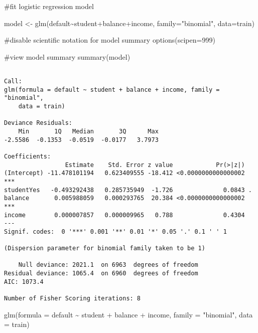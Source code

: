 \documentclass[
  letterpaper,
  DIV=11,
  numbers=noendperiod]{scrreprt}
\newenvironment{Shaded}{\begin{snugshade}}{\end{snugshade}}
\newcommand{\AttributeTok}[1]{\textcolor[rgb]{0.40,0.45,0.13}{#1}}
\newcommand{\CommentTok}[1]{\textcolor[rgb]{0.37,0.37,0.37}{#1}}
\newcommand{\DecValTok}[1]{\textcolor[rgb]{0.68,0.00,0.00}{#1}}
\newcommand{\FunctionTok}[1]{\textcolor[rgb]{0.28,0.35,0.67}{#1}}
\newcommand{\NormalTok}[1]{\textcolor[rgb]{0.00,0.23,0.31}{#1}}
\newcommand{\OtherTok}[1]{\textcolor[rgb]{0.00,0.23,0.31}{#1}}
\newcommand{\SpecialCharTok}[1]{\textcolor[rgb]{0.37,0.37,0.37}{#1}}
\newcommand{\StringTok}[1]{\textcolor[rgb]{0.13,0.47,0.30}{#1}}
\begin{document}
\begin{Shaded}
\begin{Highlighting}[]
\CommentTok{\#fit logistic regression model}

\NormalTok{model }\OtherTok{\textless{}{-}} \FunctionTok{glm}\NormalTok{(default}\SpecialCharTok{\textasciitilde{}}\NormalTok{student}\SpecialCharTok{+}\NormalTok{balance}\SpecialCharTok{+}\NormalTok{income, }\AttributeTok{family=}\StringTok{"binomial"}\NormalTok{, }\AttributeTok{data=}\NormalTok{train)}

\CommentTok{\#disable scientific notation for model summary}
\FunctionTok{options}\NormalTok{(}\AttributeTok{scipen=}\DecValTok{999}\NormalTok{)}

\CommentTok{\#view model summary}
\FunctionTok{summary}\NormalTok{(model)}
\end{Highlighting}
\end{Shaded}

\begin{verbatim}

Call:
glm(formula = default ~ student + balance + income, family = "binomial", 
    data = train)

Deviance Residuals: 
    Min       1Q   Median       3Q      Max  
-2.5586  -0.1353  -0.0519  -0.0177   3.7973  

Coefficients:
                 Estimate    Std. Error z value            Pr(>|z|)    
(Intercept) -11.478101194   0.623409555 -18.412 <0.0000000000000002 ***
studentYes   -0.493292438   0.285735949  -1.726              0.0843 .  
balance       0.005988059   0.000293765  20.384 <0.0000000000000002 ***
income        0.000007857   0.000009965   0.788              0.4304    
---
Signif. codes:  0 '***' 0.001 '**' 0.01 '*' 0.05 '.' 0.1 ' ' 1

(Dispersion parameter for binomial family taken to be 1)

    Null deviance: 2021.1  on 6963  degrees of freedom
Residual deviance: 1065.4  on 6960  degrees of freedom
AIC: 1073.4

Number of Fisher Scoring iterations: 8
\end{verbatim}

\begin{Shaded}
\begin{Highlighting}[]
\FunctionTok{glm}\NormalTok{(}\AttributeTok{formula =}\NormalTok{ default }\SpecialCharTok{\textasciitilde{}}\NormalTok{ student }\SpecialCharTok{+}\NormalTok{ balance }\SpecialCharTok{+}\NormalTok{ income, }\AttributeTok{family =} \StringTok{"binomial"}\NormalTok{, }
    \AttributeTok{data =}\NormalTok{ train)}
\end{Highlighting}
\end{Shaded}
\end{document}
